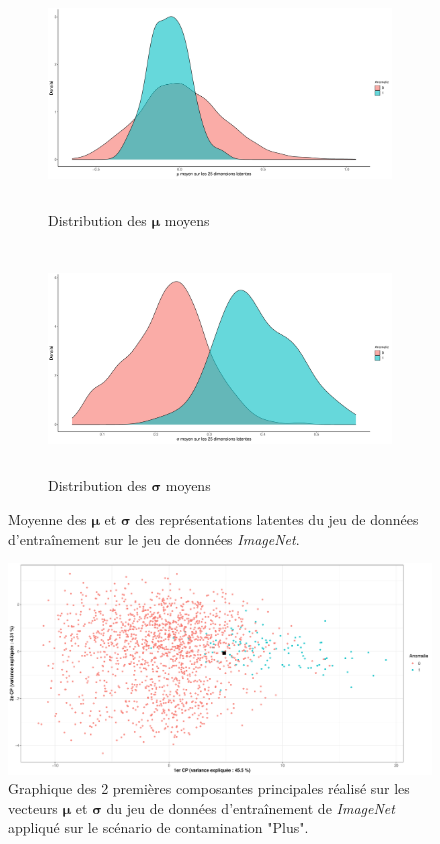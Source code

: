 \begin{figure}[H]
	\centering
	\begin{subfigure}{12cm}
		\centering\includegraphics[width=12cm, height=6cm]{images/latent_stats/plot_mu}
		\caption{Distribution des $\boldsymbol{\mu}$ moyens}
	\end{subfigure}
	\begin{subfigure}{12cm}
		\centering\includegraphics[width=12cm, height=6cm]{images/latent_stats/plot_sigma}
		\caption{Distribution des $\boldsymbol{\sigma}$ moyens}
	\end{subfigure}
	\caption{Moyenne des $\boldsymbol{\mu}$ et $\boldsymbol{\sigma}$ des représentations latentes du jeu de données d'entraînement sur le jeu de données \textit{ImageNet}.}
	\label{fig:cars_latent_stats}
\end{figure}

\begin{figure}[htb]
	\centering
	\centering\includegraphics[width=\linewidth]{images/plot_pca_cars}
	\caption{Graphique des 2 premières composantes principales réalisé sur les vecteurs $\boldsymbol{\mu}$ et $\boldsymbol{\sigma}$ du jeu de données d'entraînement de \textit{ImageNet} appliqué sur le scénario de contamination "Plus".}
	\label{fig:pca_cars}
\end{figure}



